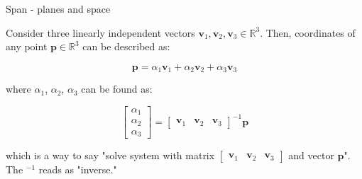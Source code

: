 \documentclass{beamer}
\begin{document}
\begin{frame}{Span - planes and space}
	\begin{flushleft}
		
		Consider three linearly independent vectors $\mathbf v_1, \mathbf v_2, \mathbf v_3 \in \mathbb R^3$. Then, coordinates of any point $\mathbf p \in \mathbb R^3$ can be described as:
		
		\begin{equation}
			\mathbf p = \alpha_1 \mathbf v_1 + \alpha_2 \mathbf v_2 + \alpha_3 \mathbf v_3
		\end{equation}
		
		where $\alpha_1$, $\alpha_2$, $\alpha_3$ can be found as:
		
		\begin{equation}
			\begin{bmatrix}
				\alpha_1 \\ \alpha_2 \\ \alpha_3
			\end{bmatrix}
			=
			\begin{bmatrix}
				\mathbf v_1 &  \mathbf v_2 &  \mathbf v_3
			\end{bmatrix}^{-1}
			\mathbf p
		\end{equation}
		
		which is a way to say "solve system with matrix $	\begin{bmatrix}
			\mathbf v_1 &  \mathbf v_2 &  \mathbf v_3
		\end{bmatrix}$ and vector $\mathbf p$". The $^{-1}$ reads as "inverse."
		
	\end{flushleft}
\end{frame}
\end{document}

